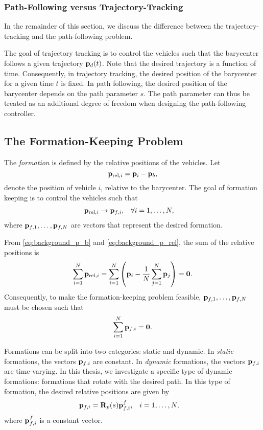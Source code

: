 \subsubsection{Path-Following versus Trajectory-Tracking}
In the remainder of this section, we discuss the difference between the trajectory-tracking and the path-following problem.

The goal of trajectory tracking is to control the vehicles such that the barycenter follows a given trajectory $\mathbf{p}_d(t)$.
Note that the desired trajectory is a function of time.
Consequently, in trajectory tracking, the desired position of the barycenter for a given time $t$ is fixed.
In path following, the desired position of the barycenter depends on the path parameter $s$.
The path parameter can thus be treated as an additional degree of freedom when designing the path-following controller.

\subsection{The Formation-Keeping Problem}
\label{sec:background_formation_keeping}
The \emph{formation} is defined by the relative positions of the vehicles.
Let
\begin{equation}
    \mathbf{p}_{{\rm rel}, i} = \mathbf{p}_i - \mathbf{p}_b,
    \label{eq:background_p_rel}
\end{equation}
denote the position of vehicle $i$, relative to the barycenter.
The goal of formation keeping is to control the vehicles such that
\begin{align}
    &\mathbf{p}_{{\rm rel}, i} \rightarrow \mathbf{p}_{f, i}, &
    & \forall i = 1, \ldots, N,
\end{align}
where $\mathbf{p}_{f, 1}, \ldots, \mathbf{p}_{f, N}$ are vectors that represent the desired formation.

From \eqref{eq:background_p_b} and \eqref{eq:background_p_rel}, the sum of the relative positions is
\begin{equation}
    \sum_{i=1}^N \mathbf{p}_{{\rm rel}, i} = \sum_{i=1}^N \left(\mathbf{p}_i - \frac{1}{N}\sum_{j=1}^N \mathbf{p}_j \right) = \mathbf{0}.
\end{equation}
Consequently, to make the formation-keeping problem feasible, $\mathbf{p}_{f, 1}, \ldots, \mathbf{p}_{f, N}$ must be chosen such that
\begin{equation}
    \sum_{i=1}^N \mathbf{p}_{f, i} = \mathbf{0}.
\end{equation}

Formations can be split into two categories: static and dynamic.
In \emph{static} formations, the vectors $\mathbf{p}_{f, i}$ are constant.
In \emph{dynamic} formations, the vectors $\mathbf{p}_{f, i}$ are time-varying.
In this thesis, we investigate a specific type of dynamic formations: formations that rotate with the desired path.
In this type of formation, the desired relative positions are given by
\begin{align}
    \mathbf{p}_{f, i} &= \mathbf{R}_p(s) \mathbf{p}_{f, i}^f,&
    i &= 1, \ldots, N,
\end{align}
where $\mathbf{p}_{f, i}^f$ is a constant vector.

